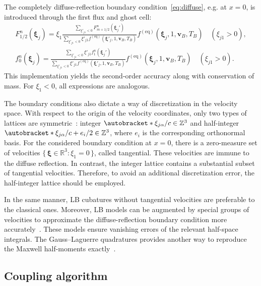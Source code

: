 \documentclass[]{elsarticle} %
\newcommand{\Set}[2]{\{\,{#1}:{#2}\,\}}
\DeclarePairedDelimiter\autobracket()       %
\newcommand{\br}[1]{\autobracket*{#1}}
\newcommand{\bxi}{\boldsymbol{\xi}}
\newcommand{\bv}{\boldsymbol{v}}
\newcommand{\equil}[1]{#1^\mathrm{(eq)}}
\newcommand{\xiai}{\xi_{j \alpha}}
\begin{document}
The completely diffuse-reflection boundary condition~\eqref{eq:diffuse}, e.g. at \(x=0\),
is introduced through the first flux and ghost cell:
\begin{gather}
    F_{1/2}^n(\bxi_j) = \displaystyle\xi_1\frac{\sum_{\xi'_{j1}<0}F_{m+1/2}^n(\bxi_j')}
        {\sum_{\xi'_{j1}<0}\xi'_{j1}\equil{f}(\bxi'_j,1,\bv_B,T_B)}
        \equil{f}(\bxi_j, 1, \bv_B, T_B) \quad (\xi_{j1}>0), \label{eq:first_flux}\\
    f_0^n(\bxi_j) = \displaystyle\frac{\sum_{\xi'_{j1}<0}\xi'_{j1}f_1^n(\bxi_j')}
        {\sum_{\xi'_{j1}<0}\xi'_{j1}\equil{f}(\bxi'_j,1,\bv_B,T_B)}
        \equil{f}(\bxi_j, 1, \bv_B, T_B) \quad (\xi_{j1}>0). \label{eq:first_ghost}
\end{gather}
This implementation yields the second-order accuracy along with conservation of mass.
For \(\xi_1<0\), all expressions are analogous.

The boundary conditions also dictate a way of discretization in the velocity space.
With respect to the origin of the velocity coordinates, only two types of lattices are symmetric~\cite{Inamuro1990}:
integer \(\br{\xiai/c} \in \mathbb{Z}^3\) and half-integer \(\br{\xiai/c + e_i/2} \in \mathbb{Z}^3\),
where \(e_i\) is the corresponding orthonormal basis.
For the considered boundary condition at \(x=0\), there is a zero-measure set of velocities
\(\Set{\bxi\in\mathbb{R}^3}{\xi_1=0}\), called tangential.
These velocities are immune to the diffuse reflection.
In contrast, the integer lattice contains a substantial subset of tangential velocities.
Therefore, to avoid an additional discretization error, the half-integer lattice should be employed.

In the same manner, LB cubatures without tangential velocities are preferable to the classical ones.
Moreover, LB models can be augmented by special groups of velocities to approximate
the diffuse-reflection boundary condition more accurately~\cite{Feuchter2016}.
These models ensure vanishing errors of the relevant half-space integrals.
The Gauss--Laguerre quadratures provides another way to reproduce the Maxwell half-moments exactly~\cite{Ambrus2014, Ambrus2016}.

\subsection{Coupling algorithm}\label{sec:numerics:coupling}

\end{document}
